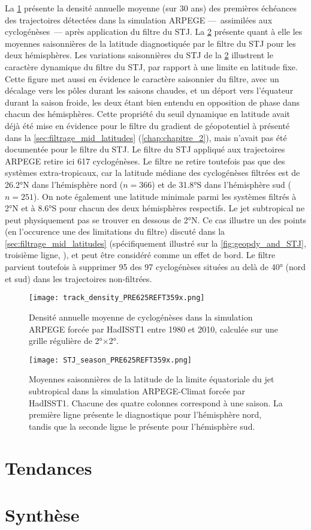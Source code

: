 \documentclass[../main.tex]{subfiles}
\begin{document}
La \cref{fig:track_density_PRE625REFT359x} présente la densité annuelle moyenne (sur \num{30} ans) des premières échéances des trajectoires détectées dans la
simulation ARPEGE ---~assimilées aux cyclogénèses~--- après application du filtre du STJ. La \cref{fig:STJ_PRE625REFT359x} présente quant à elle les moyennes
saisonnières de la latitude diagnostiquée par le filtre du STJ pour les deux hémisphères. Les variations saisonnières du STJ de la \cref{fig:STJ_PRE625REFT359x}
illustrent le caractère dynamique du filtre du STJ, par rapport à une limite en latitude fixe. Cette figure met aussi en évidence le caractère saisonnier du
filtre, avec un décalage vers les pôles durant les saisons chaudes, et un déport vers l'équateur durant la saison froide, les deux étant bien entendu en
opposition de phase dans chacun des hémisphères. Cette propriété du seuil dynamique en latitude avait déjà été mise en évidence pour le filtre du gradient de
géopotentiel à  présenté dans la \cref{sec:filtrage_mid_latitudes} (\cref{chap:chapitre_2}), mais n'avait pas été documentée pour le filtre du STJ. Le
filtre du STJ appliqué aux trajectoires ARPEGE retire ici \num{617} cyclogénèses. Le filtre ne retire toutefois pas que des systèmes extra-tropicaux, car la
latitude médiane des cyclogénèses filtrées est de \ang{26.2}N dans l'hémisphère nord ($n = \num{366}$) et de \ang{31.8}S dans l'hémisphère sud ($n=251$). On
note également une latitude minimale parmi les systèmes filtrés à \ang{2}N et à \ang{8.6}S pour chacun des deux hémisphères respectifs. Le jet subtropical ne
peut physiquement pas se trouver en dessous de \ang{2}N. Ce cas illustre un des points (en l'occurence une des limitations du filtre) discuté dans la
\cref{sec:filtrage_mid_latitudes} (spécifiquement illustré sur la \cref{fig:geopdy_and_STJ}, troisième ligne, ), et peut être
considéré comme un effet de bord. Le filtre parvient toutefois à supprimer \num{95} des \num{97} cyclogénèses situées au delà de \ang{40} (nord et sud) dans les
trajectoires non-filtrées.

\begin{figure}[tp]
    \centering
    \texttt{[image: track\_density\_PRE625REFT359x.png]}
    \caption{Densité annuelle moyenne de cyclogénèses dans la simulation ARPEGE forcée par HadISST1 entre 1980 et 2010, calculée sur une grille régulière de
    \ang{2}$\times$\ang{2}.}
    \label{fig:track_density_PRE625REFT359x}
\end{figure}
%
\begin{figure}[tp]
    \centering
    \texttt{[image: STJ\_season\_PRE625REFT359x.png]}
    \caption{Moyennes saisonnières de la latitude de la limite équatoriale du jet subtropical dans la simulation ARPEGE-Climat forcée par HadISST1. Chacune des
    quatre colonnes correspond à une saison. La première ligne présente le diagnostique pour l'hémisphère nord, tandis que la seconde ligne le présente pour
    l'hémisphère sud.}
    \label{fig:STJ_PRE625REFT359x}
\end{figure}

\section{Tendances}

\section{Synthèse}
\end{document}
